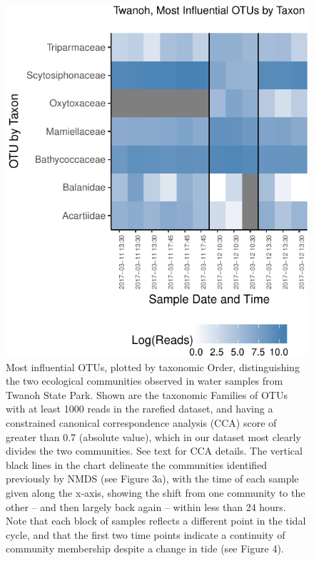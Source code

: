 \documentclass[fleqn,10pt,lineno]{wlpeerj} %
\begin{document}
\begin{figure}[!ht]

{\centering \includegraphics{figures/FIG7_TW_Families_turnover-1} 

}

\caption{\label{fig:fig7}Most influential OTUs, plotted by taxonomic Order, distinguishing the two ecological communities observed in water samples from Twanoh State Park. Shown are the taxonomic Families of OTUs with at least 1000 reads in the rarefied dataset, and having a constrained canonical correspondence analysis (CCA) score of greater than 0.7 (absolute value), which in our dataset most clearly divides the two communities. See text for CCA details. The vertical black lines in the chart delineate the communities identified previously by NMDS (see Figure 3a), with the time of each sample given along the x-axis, showing the shift from one community to the other -- and then largely back again -- within less than 24 hours. Note that each block of samples reflects a different point in the tidal cycle, and that the first two time points indicate a continuity of community membership despite a change in tide (see Figure 4).}\label{fig:FIG7_TW_Families_turnover}
\end{figure}
\end{document}
